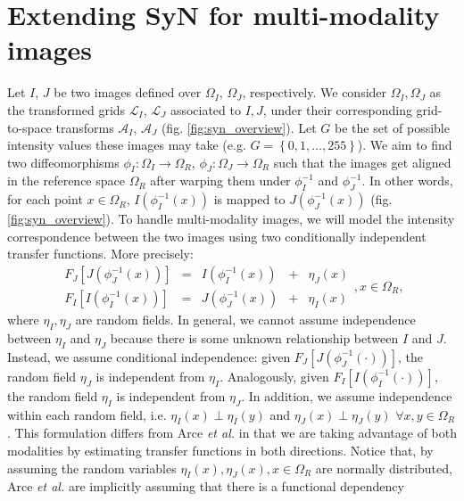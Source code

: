 \section{Extending SyN for multi-modality images}

Let $I$, $J$ be two images defined over $\Omega_{I}$, $\Omega_{J}$, respectively. We consider $\Omega_{I}, \Omega_{J}$ as the transformed grids $\mathcal{L}_{I}$, $\mathcal{L}_{J}$
associated to $I, J$, under their corresponding grid-to-space transforms $\mathcal{A}_{I}$, $\mathcal{A}_{J}$ (fig. \ref{fig:syn_overview}). Let $G$ be the set of possible intensity
values these images may take (e.g. $G=\left\lbrace 0,1,...,255\right\rbrace$). We aim to find two diffeomorphisms
$\phi_{I}:\Omega_{I}\rightarrow \Omega_{R}$, $\phi_{J}:\Omega_{J}\rightarrow \Omega_{R}$ such that the images get aligned in the reference space $\Omega_{R}$
after warping them under $\phi_{I}^{-1}$ and $\phi_{J}^{-1}$. In other words, for each point $x \in \Omega_{R}$, $I(\phi_{I}^{-1}(x))$ is mapped to $J(\phi_{J}^{-1}(x))$
(fig. \ref{fig:syn_overview}). To handle multi-modality images, we will model the intensity correspondence between the two images using two conditionally independent transfer functions.
More precisely:
\begin{equation}\label{eq:SyNEM_gom_ref}
    \begin{array}{ccccc}
        F_{J}\left[J(\phi_{J}^{-1}(x))\right] &=& I(\phi_{I}^{-1}(x)) &+& \eta_{J}(x)\\
        F_{I}\left[I(\phi_{I}^{-1}(x))\right] &=& J(\phi_{J}^{-1}(x)) &+& \eta_{I}(x)
    \end{array}, x\in\Omega_{R},
\end{equation}
where $\eta_{I}, \eta_{J}$ are random fields. In general, we cannot assume independence between $\eta_{I}$ and $\eta_{J}$ because there is some unknown relationship between $I$ and $J$.
Instead, we assume conditional independence: given $F_{J}[J(\phi_{J}^{-1}(\cdot))]$, the random field $\eta_{J}$ is independent from $\eta_{I}$. Analogously, given
$F_{I}[I(\phi_{I}^{-1}(\cdot))]$, the random field $\eta_{I}$ is independent from $\eta_{J}$. In addition, we assume independence within each random field, i.e.
\hbox{$\eta_{I}(x) \perp \eta_{I}(y)$} and \hbox{$\eta_{J}(x) \perp \eta_{J}(y)$} \hbox{$\forall x,y\in\Omega_{R}$}. This formulation differs from Arce {\it et al.} \cite{Arce-santana2014} in that
we are taking advantage of both modalities by estimating transfer functions in both directions. Notice that, by assuming the random variables
$\eta_{I}(x), \eta_{J}(x), x\in\Omega_{R}$ are normally distributed, Arce {\it et al.} \cite{Arce-santana2014} are implicitly assuming that there is a functional dependency
